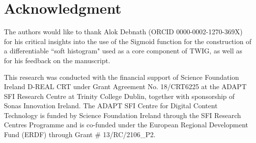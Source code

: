 \section*{Acknowledgment}
The authors would like to thank Alok Debnath (ORCID 0000-0002-1270-369X) for his critical insights into the use of the Sigmoid function for the construction of a differentiable ``soft histogram" used as a core component of TWIG, as well as for his feedback on the manuscript.

This research was conducted with the financial support of Science Foundation Ireland D-REAL CRT under Grant Agreement No. 18/CRT6225 at the ADAPT SFI Research Centre at Trinity College Dublin, together with sponsorship of Sonas Innovation Ireland. The ADAPT SFI Centre for Digital Content Technology is funded by Science Foundation Ireland through the SFI Research Centres Programme and is co-funded under the European Regional Development Fund (ERDF) through Grant \# 13/RC/2106\_P2.

